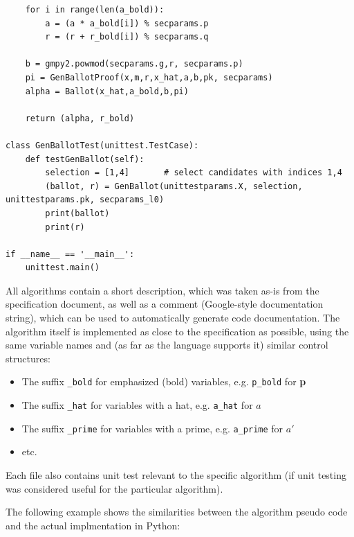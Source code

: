 \begin{verbatim}
    for i in range(len(a_bold)):
        a = (a * a_bold[i]) % secparams.p
        r = (r + r_bold[i]) % secparams.q

    b = gmpy2.powmod(secparams.g,r, secparams.p)
    pi = GenBallotProof(x,m,r,x_hat,a,b,pk, secparams)
    alpha = Ballot(x_hat,a_bold,b,pi)

    return (alpha, r_bold)

class GenBallotTest(unittest.TestCase):
    def testGenBallot(self):
        selection = [1,4]       # select candidates with indices 1,4
        (ballot, r) = GenBallot(unittestparams.X, selection, unittestparams.pk, secparams_l0)
        print(ballot)
        print(r)

if __name__ == '__main__':
    unittest.main()
\end{verbatim}

All algorithms contain a short description, which was taken as-is from the specification document, as well as a comment (Google-style documentation string), which can be used to automatically generate code documentation. The algorithm itself is implemented as close to the specification as possible, using the same variable names and (as far as the language supports it) similar control structures:

\begin{itemize}
	\item The suffix \texttt{\_bold} for emphasized (bold) variables, e.g. \texttt{p\_bold} for \textbf{p}
	\item The suffix \texttt{\_hat} for variables with a hat, e.g. \texttt{a\_hat} for $\hat{a}$
	\item The suffix \texttt{\_prime} for variables with a prime, e.g. \texttt{a\_prime} for $a'$
	\item etc.
\end{itemize}

Each file also contains unit test relevant to the specific algorithm (if unit testing was considered useful for the particular algorithm).

The following example shows the similarities between the algorithm pseudo code and the actual implmentation in Python:

